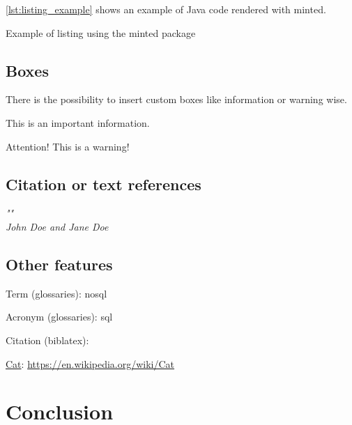 \autoref{lst:listing_example} shows an example of Java code rendered with minted.

\begin{listing}[H]
    \caption{Example of listing using the minted package}
    \label{lst:listing_example}
\end{listing}

\subsection{Boxes}

There is the possibility to insert custom boxes like  information or warning wise.

\begin{info}
    This is an important information.
\end{info}

\begin{warning}
    Attention! This is a warning!
\end{warning}

\subsection{Citation or text references}
\begin{tcolorbox}[
    colback=white,
    colframe=languidlavender,
    sharp corners,
    title={\textit{Citation}},
    fonttitle=\bfseries\color{black}
]
\textit{"\lipsum[1][1]"} \\[1ex]
\hfill \textit{John Doe and Jane Doe}
\end{tcolorbox}

\subsection{Other features}

Term (glossaries): \gls{nosql}

Acronym (glossaries): \gls{sql}

Citation (biblatex): \cite{paper_millwheel}

\href{https://en.wikipedia.org/wiki/Cat}{Cat}: 
\url{https://en.wikipedia.org/wiki/Cat}


\section{Conclusion}

\blindtext

